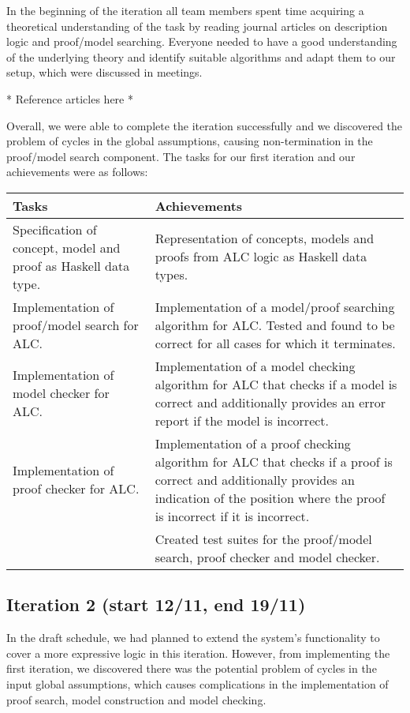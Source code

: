 In the beginning of the iteration all team members spent time acquiring a theoretical understanding of the task by reading journal articles on description logic and proof/model searching. Everyone needed to have a good understanding of the underlying theory and identify suitable algorithms and adapt them to our setup, which were discussed in meetings.

* Reference articles here *

Overall, we were able to complete the iteration successfully and we discovered the problem of cycles in the global assumptions, causing non-termination in the proof/model search component. The tasks for our first iteration and our achievements were as follows:

\begin{center}
\begin{longtable}{| p{7cm} | p{8cm} |}
\hline
\textbf{Tasks} & \textbf{Achievements} \\
\hline
Specification of concept, model and proof as Haskell data type. & Representation of concepts, models and proofs from ALC logic as Haskell data types.\\
\hline
Implementation of proof/model search for ALC. & Implementation of a model/proof searching algorithm for ALC. Tested and found to be correct for all cases for which it terminates.\\
\hline
Implementation of model checker for ALC. & Implementation of a model checking algorithm for ALC that checks if a model is correct and additionally provides an error report if the model is incorrect.\\
\hline
Implementation of proof checker for ALC. & Implementation of a proof checking algorithm for ALC that checks if a proof is correct and additionally provides an indication of the position where the proof is incorrect if it is incorrect.\\
\hline
 & Created test suites for the proof/model search, proof checker and model checker.\\
\hline
\end{longtable}
\end{center}

\subsection*{Iteration 2 (start 12/11, end 19/11)}

In the draft schedule, we had planned to extend the system's functionality to cover a more expressive logic in this iteration. However, from implementing the first iteration, we discovered there was the potential problem of cycles in the input global assumptions, which causes complications in the implementation of proof search, model construction and model checking.

